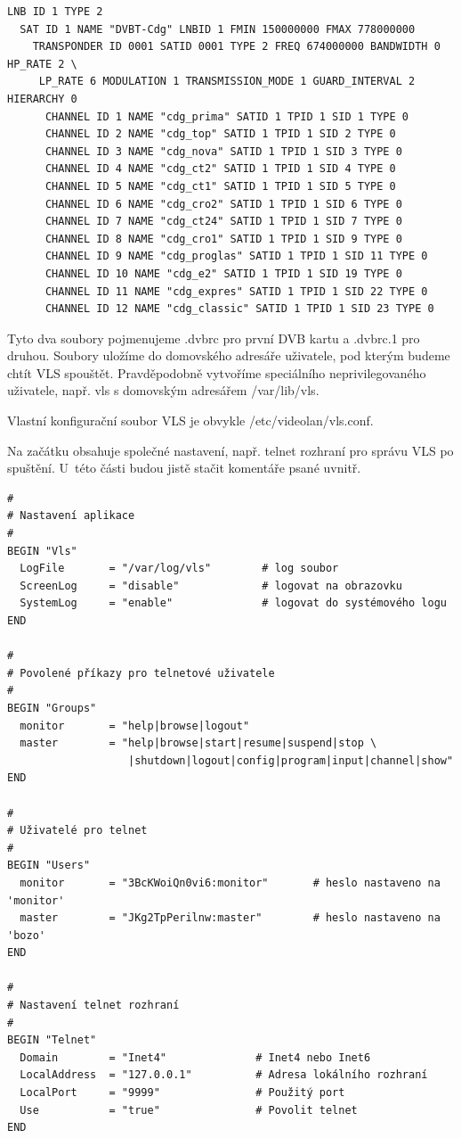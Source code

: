 \begin{small}
\begin{verbatim}
LNB ID 1 TYPE 2
  SAT ID 1 NAME "DVBT-Cdg" LNBID 1 FMIN 150000000 FMAX 778000000
    TRANSPONDER ID 0001 SATID 0001 TYPE 2 FREQ 674000000 BANDWIDTH 0 HP_RATE 2 \
     LP_RATE 6 MODULATION 1 TRANSMISSION_MODE 1 GUARD_INTERVAL 2 HIERARCHY 0
      CHANNEL ID 1 NAME "cdg_prima" SATID 1 TPID 1 SID 1 TYPE 0
      CHANNEL ID 2 NAME "cdg_top" SATID 1 TPID 1 SID 2 TYPE 0
      CHANNEL ID 3 NAME "cdg_nova" SATID 1 TPID 1 SID 3 TYPE 0
      CHANNEL ID 4 NAME "cdg_ct2" SATID 1 TPID 1 SID 4 TYPE 0
      CHANNEL ID 5 NAME "cdg_ct1" SATID 1 TPID 1 SID 5 TYPE 0
      CHANNEL ID 6 NAME "cdg_cro2" SATID 1 TPID 1 SID 6 TYPE 0
      CHANNEL ID 7 NAME "cdg_ct24" SATID 1 TPID 1 SID 7 TYPE 0
      CHANNEL ID 8 NAME "cdg_cro1" SATID 1 TPID 1 SID 9 TYPE 0
      CHANNEL ID 9 NAME "cdg_proglas" SATID 1 TPID 1 SID 11 TYPE 0
      CHANNEL ID 10 NAME "cdg_e2" SATID 1 TPID 1 SID 19 TYPE 0
      CHANNEL ID 11 NAME "cdg_expres" SATID 1 TPID 1 SID 22 TYPE 0
      CHANNEL ID 12 NAME "cdg_classic" SATID 1 TPID 1 SID 23 TYPE 0
\end{verbatim}
\end{small}

Tyto dva soubory pojmenujeme .dvbrc pro první DVB kartu a .dvbrc.1 pro druhou. Soubory uložíme do domovského adresáře uživatele, pod kterým budeme chtít VLS spouštět. Pravděpodobně vytvoříme speciálního neprivilegovaného uživatele, např. vls s domovským adresářem /var/lib/vls.

Vlastní konfigurační soubor VLS je obvykle /etc/videolan/vls.conf. 

Na začátku obsahuje společné nastavení, např. telnet rozhraní pro správu VLS po spuštění. U~této části budou jistě stačit komentáře psané uvnitř.

\begin{small}
\begin{verbatim}
#
# Nastavení aplikace
#
BEGIN "Vls"
  LogFile       = "/var/log/vls"        # log soubor
  ScreenLog     = "disable"             # logovat na obrazovku
  SystemLog     = "enable"              # logovat do systémového logu
END

#
# Povolené příkazy pro telnetové uživatele
#
BEGIN "Groups"
  monitor       = "help|browse|logout"
  master        = "help|browse|start|resume|suspend|stop \
                   |shutdown|logout|config|program|input|channel|show"
END

#
# Uživatelé pro telnet
#
BEGIN "Users"
  monitor       = "3BcKWoiQn0vi6:monitor"       # heslo nastaveno na 'monitor'
  master        = "JKg2TpPerilnw:master"        # heslo nastaveno na 'bozo'
END

#
# Nastavení telnet rozhraní
#
BEGIN "Telnet"
  Domain        = "Inet4"              # Inet4 nebo Inet6
  LocalAddress  = "127.0.0.1"          # Adresa lokálního rozhraní
  LocalPort     = "9999"               # Použitý port
  Use           = "true"               # Povolit telnet
END
\end{verbatim}
\end{small}

